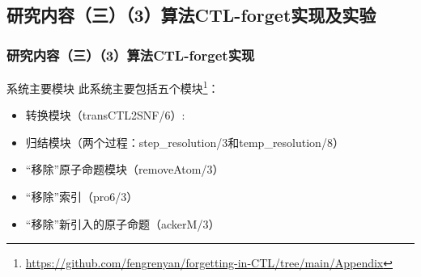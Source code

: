 \documentclass[9pt, CJK]{beamer}
\begin{document}
\subsection{研究内容（三）（3）算法CTL-forget实现及实验} 
%	

\begin{frame}
	\frametitle{研究内容（三）（3）算法CTL-forget实现}
	{\footnotesize
		\begin{block}{系统主要模块}
			此系统主要包括五个模块\footnote{ \url{https://github.com/fengrenyan/forgetting-in-CTL/tree/main/Appendix}}：
			\begin{itemize}
				\item 转换模块（transCTL2SNF/6）: 
				\item 归结模块（两个过程：step\_resolution/3和temp\_resolution/8）
				\item “移除”原子命题模块（removeAtom/3）
				\item “移除”索引（pro6/3）
				\item “移除”新引入的原子命题（ackerM/3）
			\end{itemize} 
		\end{block}
	}
\end{frame}
\end{document}
